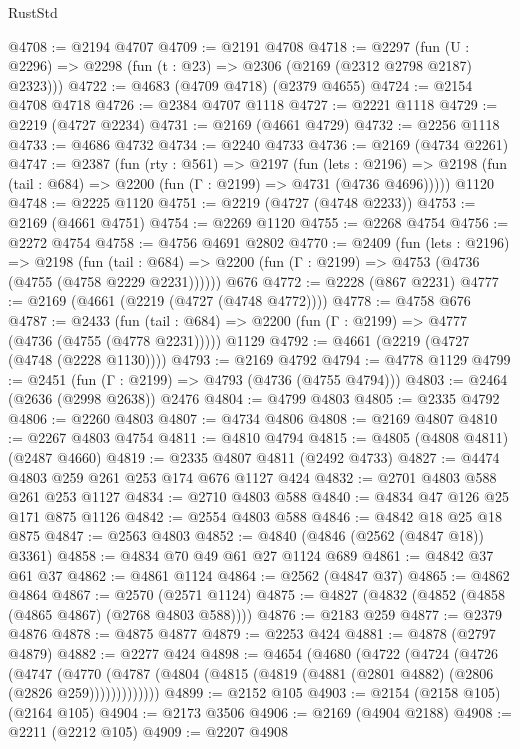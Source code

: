 \begin{lexlean}{RustStd}
\begin{coremodule}
{\begin{coremodule}
{{{{{{{{{{{{{{{@4708 := @2194 @4707
@4709 := @2191 @4708
@4718 := @2297 (fun (U : @2296) => @2298 (fun (t : @23) => @2306 (@2169 (@2312 @2798 @2187) @2323)))
@4722 := @4683 (@4709 @4718) (@2379 @4655)
@4724 := @2154 @4708 @4718
@4726 := @2384 @4707 @1118
@4727 := @2221 @1118
@4729 := @2219 (@4727 @2234)
@4731 := @2169 (@4661 @4729)
@4732 := @2256 @1118
@4733 := @4686 @4732
@4734 := @2240 @4733
@4736 := @2169 (@4734 @2261)
@4747 := @2387
    (fun (rty : @561) =>
    @2197
      (fun (lets : @2196) =>
      @2198 (fun (tail : @684) => @2200 (fun (Γ : @2199) => @4731 (@4736 @4696)))))
    @1120
@4748 := @2225 @1120
@4751 := @2219 (@4727 (@4748 @2233))
@4753 := @2169 (@4661 @4751)
@4754 := @2269 @1120
@4755 := @2268 @4754
@4756 := @2272 @4754
@4758 := @4756 @4691 @2802
@4770 := @2409
    (fun (lets : @2196) =>
    @2198
      (fun (tail : @684) => @2200 (fun (Γ : @2199) => @4753 (@4736 (@4755 (@4758 @2229 @2231))))))
    @676
@4772 := @2228 (@867 @2231)
@4777 := @2169 (@4661 (@2219 (@4727 (@4748 @4772))))
@4778 := @4758 @676
@4787 := @2433
    (fun (tail : @684) => @2200 (fun (Γ : @2199) => @4777 (@4736 (@4755 (@4778 @2231)))))
    @1129
@4792 := @4661 (@2219 (@4727 (@4748 (@2228 @1130))))
@4793 := @2169 @4792
@4794 := @4778 @1129
@4799 := @2451 (fun (Γ : @2199) => @4793 (@4736 (@4755 @4794)))
@4803 := @2464 (@2636 (@2998 @2638)) @2476
@4804 := @4799 @4803
@4805 := @2335 @4792
@4806 := @2260 @4803
@4807 := @4734 @4806
@4808 := @2169 @4807
@4810 := @2267 @4803 @4754
@4811 := @4810 @4794
@4815 := @4805 (@4808 @4811) (@2487 @4660)
@4819 := @2335 @4807 @4811 (@2492 @4733)
@4827 := @4474 @4803 @259 @261 @253 @174 @676 @1127 @424
@4832 := @2701 @4803 @588 @261 @253 @1127
@4834 := @2710 @4803 @588
@4840 := @4834 @47 @126 @25 @171 @875 @1126
@4842 := @2554 @4803 @588
@4846 := @4842 @18 @25 @18 @875
@4847 := @2563 @4803
@4852 := @4840 (@4846 (@2562 (@4847 @18)) @3361)
@4858 := @4834 @70 @49 @61 @27 @1124 @689
@4861 := @4842 @37 @61 @37
@4862 := @4861 @1124
@4864 := @2562 (@4847 @37)
@4865 := @4862 @4864
@4867 := @2570 (@2571 @1124)
@4875 := @4827 (@4832 (@4852 (@4858 (@4865 @4867) (@2768 @4803 @588))))
@4876 := @2183 @259
@4877 := @2379 @4876
@4878 := @4875 @4877
@4879 := @2253 @424
@4881 := @4878 (@2797 @4879)
@4882 := @2277 @424
@4898 := @4654
    (@4680
      (@4722
        (@4724
          (@4726
            (@4747
              (@4770
                (@4787 (@4804 (@4815 (@4819 (@4881 (@2801 @4882) (@2806 (@2826 @259)))))))))))))
@4899 := @2152 @105
@4903 := @2154 (@2158 @105) (@2164 @105)
@4904 := @2173 @3506
@4906 := @2169 (@4904 @2188)
@4908 := @2211 (@2212 @105)
@4909 := @2207 @4908
}}}}}}}}}}}}}}}
\end{coremodule}}
\end{coremodule}
\end{lexlean}
